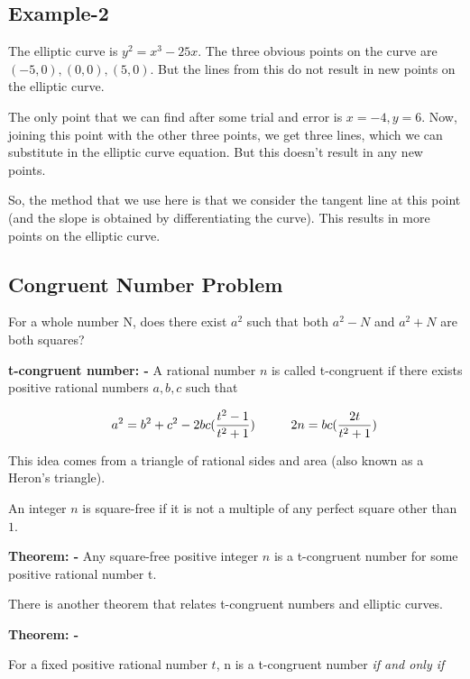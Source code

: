 \documentclass[12pt]{article}
\begin{document}
\subsection{Example-2}

The elliptic curve is $y^2 = x^3 − 25x$.
The three obvious points on the curve are 
$(-5,0), (0,0), (5,0)$. But the lines from this do not result in new points on the elliptic curve. 

The only point that we can find after some trial and error is $x = -4, y = 6$. Now, joining this point with the other three points, we get three lines, which we can substitute in the elliptic curve equation. But this doesn't result in any new points. 

So, the method that we use here is that we consider the tangent line at this point (and the slope is obtained by differentiating the curve). This results in more points on the elliptic curve. 

\subsection{Congruent Number Problem}

For a whole number N, does there exist $a^2$ such that both $a^2 - N$ and $a^2 + N$ are both squares?

\textbf{t-congruent number: -}
A rational number $n$ is called t-congruent if there exists positive rational numbers $a,b,c$ such that

\begin{equation*}
\hspace{0.5cm}
a^2 = b^2 + c^2 - 2bc(\frac{t^2 - 1}{t^2 + 1})
\hspace{1cm}
2n = bc(\frac{2t}{t^2 + 1})
\end{equation*}

This idea comes from a triangle of rational sides and area (also known as a Heron's triangle). 

An integer $n$ is square-free if it is not a multiple of any perfect square other than $1$.

\textbf{Theorem: -} Any square-free positive integer $n$ is a t-congruent number for some positive rational number t. 

There is another theorem that relates t-congruent numbers and elliptic curves. 

\textbf{Theorem: -}

For a fixed positive rational number $t$, n is a t-congruent number \emph{if and only if}
\end{document}
